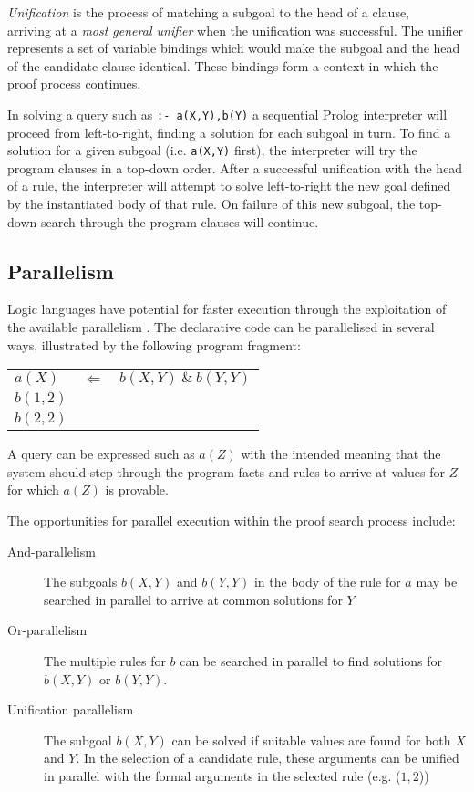 \textit{Unification} is the process of matching a subgoal to the head of a clause,\\
arriving at a \textit{most general unifier} when the unification was successful.  The
unifier represents a set of variable bindings which would make the subgoal and the
head of the candidate clause identical.  These bindings form a context in which the
proof process continues.

In solving a query such as \texttt{:- a(X,Y),b(Y)} a sequential Prolog interpreter
will proceed from left-to-right, finding a solution for each subgoal in turn.  To
find a solution for a given subgoal (i.e. \texttt{a(X,Y)} first), the interpreter will
try the program clauses in a top-down order.  After a successful unification with the
head of a rule, the interpreter will attempt to solve left-to-right
the new goal defined by the
instantiated body of that rule.  On failure of this new subgoal, the top-down
search through the program clauses will continue.

\subsection{Parallelism}

Logic languages have potential for faster execution through the
exploitation of the available parallelism \cite{Tic91}.  The 
declarative code can be parallelised in several ways, illustrated by the
following program fragment:

\begin{tabular}{l l l}
$a(X)$   &$\Leftarrow$ &$b(X,Y)\  \&\  b(Y,Y)$\\
$b(1,2)$ &             &\\
$b(2,2)$ &             &\\
\end{tabular}

A query can be expressed such as $a(Z)$
with the intended meaning that the system should
step through the program facts and rules to arrive at values for $Z$
for which $a(Z)$ is provable.

The opportunities for parallel execution
within the proof search process include:
\begin{description}
\item[And-parallelism]{The subgoals $b(X,Y)$ and $b(Y,Y)$
  in the body of the rule for $a$ may be searched in
  parallel to arrive at common solutions for $Y$}
\item[Or-parallelism]{The multiple rules for $b$ can be searched in
  parallel to find solutions for $b(X,Y)$ or $b(Y,Y)$.}
\item[Unification parallelism]{The subgoal $b(X,Y)$ can be solved if
  suitable values are found for both $X$ and $Y$.  In the selection of
  a candidate rule, these arguments can be unified in parallel with the
  formal arguments in the selected rule (e.g. ($1,2$))}
\end{description}

